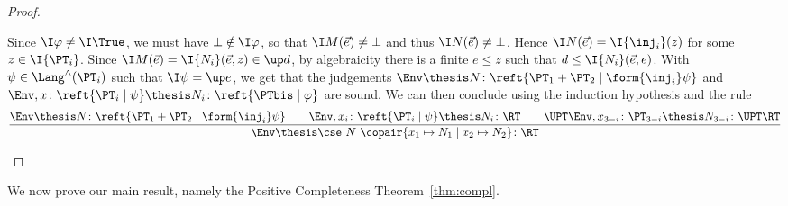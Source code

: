 \begin{proof}
\begin{description}
Since $\I\varphi \neq \I\True$,
we must have $\bot \notin \I\varphi$,
so that $\I M(\vec e) \neq \bot$
and thus $\I N(\vec e) \neq \bot$.
Hence $\I N(\vec e) = \I{\inj_i}(z)$ for some $z \in \I{\PT_i}$.
Since $\I M(\vec e) = \I{N_i}(\vec e,z) \in \up d$,
by algebraicity there is a finite $e \leq z$
such that $d \leq \I{N_i}(\vec e,e)$.
With $\psi \in \Lang^\land(\PT_i)$ such that
$\I\psi = \up e$,
we get that the judgements
$\Env \thesis N \colon \reft{\PT_1 + \PT_2 \mid \form{\inj_i}\psi}$
and
$\Env, x\colon \reft{\PT_i \mid \psi} \thesis N_i \colon \reft{\PTbis \mid \varphi}$
are sound.
We can then conclude using the induction hypothesis and the rule
\[
\dfrac{
  \Env \thesis N \colon \reft{\PT_1 + \PT_2 \mid \form{\inj_i}\psi}
  \qquad
  \Env, x_i \colon \reft{\PT_i \mid \psi} \thesis N_i \colon \RT
  \qquad
  \UPT\Env, x_{3-i} \colon \PT_{3-i} \thesis N_{3-i} \colon \UPT\RT}
  {\Env \thesis \cse\ N\ \copair{x_1 \mapsto N_1 \mid x_2 \mapsto N_2} \colon \RT}
\]
\qedhere
\end{description}
\end{proof}

We now prove our main result, namely the Positive Completeness
Theorem~\ref{thm:compl}.

\ThmCompl*

